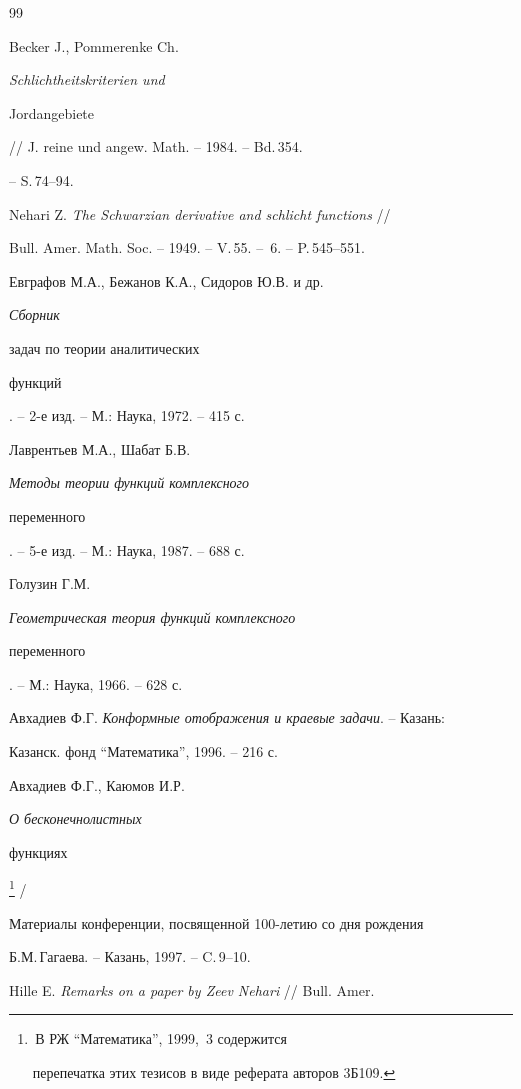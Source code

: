 \begin{thebibliography}{99} 


 




Becker J., Pommerenke Ch. {\it Schlichtheitskriterien und 


Jordangebiete} // J. reine und angew. Math. -- 1984. -- Bd.\,354. 


-- S.\,74--94. 




Nehari Z. {\it The Schwarzian derivative and schlicht functions} // 


Bull. Amer. Math. Soc. -- 1949. -- V.\,55. -- \No\,6. -- P.\,545--551. 




Евграфов М.А., Бежанов К.А., Сидоров Ю.В. и др. {\it Сборник 


задач по теории аналитических 


функций}. -- 2-е изд. -- М.: Наука, 1972. -- 415 с. 




Лаврентьев М.А., Шабат Б.В. {\it Методы теории функций комплексного 


переменного}. -- 5-е изд. -- М.: Наука, 1987. -- 688 с. 




Голузин Г.М. {\it Геометрическая теория функций комплексного 


переменного}. -- М.: Наука, 1966. -- 628 с. 




Авхадиев Ф.Г. {\it Конформные отображения и краевые задачи}. -- Казань: 


Казанск. фонд ``Математика'', 1996. -- 216 с. 




Авхадиев Ф.Г., Каюмов И.Р. {\it О бесконечнолистных


функциях\,}\footnote{\,В РЖ ``Математика'', 1999, \No\,3 содержится


перепечатка этих тезисов в виде реферата авторов 3Б109.} / 


Материалы конференции, посвященной 100-летию со дня рождения 


Б.М.\,Гагаева. -- Казань, 1997. -- C.\,9--10. 




Hille E. {\it Remarks on a paper by Zeev Nehari} // Bull. Amer. 



\end{thebibliography}
